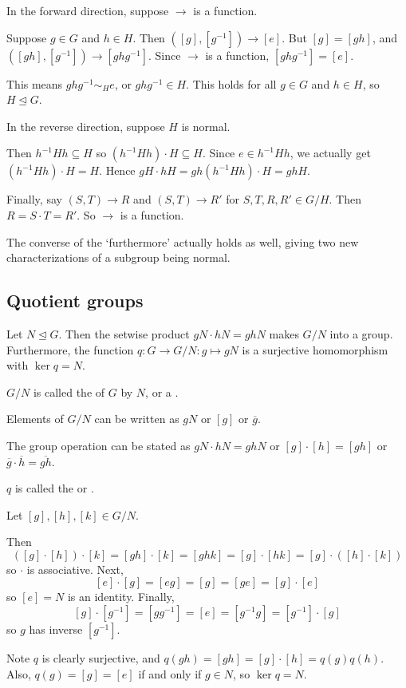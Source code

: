 \documentclass[12pt,letterpaper]{report}
\begin{document}
\begin{thmproof}
  In the forward direction, suppose $\to$ is a function.

  Suppose $g \in G$ and $h \in H$.
  Then $([g], [g^{-1}]) \to [e]$.
  But $[g] = [gh]$, and $([gh], [g^{-1}]) \to [ghg^{-1}]$.
  Since $\to$ is a function, $[ghg^{-1}] = [e]$.

  This means $ghg^{-1} \sim_H e$, or $ghg^{-1} \in H$.
  This holds for all $g \in G$ and $h \in H$, so $H \trianglelefteq G$.

  In the reverse direction, suppose $H$ is normal.

  Then $h^{-1}Hh \subseteq H$ so $(h^{-1}Hh) \cdot H \subseteq H$.
  Since $e \in h^{-1}Hh$, we actually get $(h^{-1}Hh) \cdot H = H$.
  Hence $gH \cdot hH = gh(h^{-1}Hh) \cdot H = ghH$.

  Finally, say $(S, T) \to R$ and $(S, T) \to R'$ for $S, T, R, R' \in G/H$.
  Then $R = S \cdot T = R'$.
  So $\to$ is a function.
\end{thmproof}

The converse of the `furthermore' actually holds as well, giving two new characterizations of a
subgroup being normal.

\pagebreak
\subsection{Quotient groups}

\begin{thm}{}{}
  Let $N \trianglelefteq G$.
  Then the setwise product $gN \cdot hN = ghN$ makes $G/N$ into a group.
  Furthermore, the function $q \colon G \to G/N : g \mapsto gN$ is a surjective homomorphism with
  $\ker q = N$.
\end{thm}

$G/N$ is called the  of $G$ by $N$, or a .

Elements of $G/N$ can be written as $gN$ or $[g]$ or $\overline{g}$.

The group operation can be stated as $gN \cdot hN = ghN$ or $[g] \cdot [h] = [gh]$ or
$\overline{g} \cdot \overline{h} = \overline{gh}$.

$q$ is called the  or .

\begin{thmproof}
  Let $[g], [h], [k] \in G/N$.

  Then
  \[
    ([g] \cdot [h]) \cdot [k] = [gh] \cdot [k] = [ghk] = [g] \cdot [hk] = [g] \cdot ([h] \cdot [k])
  \]
  so $\cdot$ is associative.
  Next,
  \[
    [e] \cdot [g] = [eg] = [g] = [ge] = [g] \cdot [e]
  \]
  so $[e] = N$ is an identity.
  Finally,
  \[
    [g] \cdot [g^{-1}] = [gg^{-1}] = [e] = [g^{-1}g] = [g^{-1}] \cdot [g]
  \]
  so $g$ has inverse $[g^{-1}]$.

  Note $q$ is clearly surjective, and $q(gh) = [gh] = [g] \cdot [h] = q(g)q(h)$.
  Also, $q(g) = [g] = [e]$ if and only if $g \in N$, so $\ker q = N$.
\end{thmproof}
\end{document}
